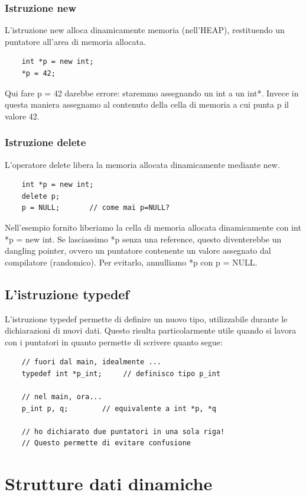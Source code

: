 \documentclass[12pt]{article}
\begin{document}
\subsubsection{Istruzione new}
\label{sssec:new_operator}
L'istruzione new alloca dinamicamente memoria (nell'HEAP), restituendo un puntatore all'area di memoria allocata.
\begin{lstlisting}
    int *p = new int;
    *p = 42;
\end{lstlisting}
Qui fare p = 42 darebbe errore: staremmo assegnando un int a un int*. Invece in questa maniera assegnamo al contenuto della cella di memoria a cui punta p il valore 42. 

\subsubsection{Istruzione delete}
\label{sssec:delete_operator}
L'operatore delete libera la memoria allocata dinamicamente mediante new.
\begin{lstlisting}
    int *p = new int;
    delete p;
    p = NULL;       // come mai p=NULL?
\end{lstlisting}
Nell'esempio fornito liberiamo la cella di memoria allocata dinamicamente con int *p = new int. Se lasciassimo *p senza una reference, questo diventerebbe un dangling pointer, ovvero un puntatore contenente un valore assegnato dal compilatore (randomico). Per evitarlo, annulliamo *p con p = NULL. 

\subsection{L'istruzione typedef}
\label{ssec:typedef_instruction}
L'istruzione typedef permette di definire un nuovo tipo, utilizzabile durante le dichiarazioni di nuovi dati. Questo risulta particolarmente utile quando si lavora con i puntatori in quanto permette di scrivere quanto segue:
\begin{lstlisting}
    // fuori dal main, idealmente ...
    typedef int *p_int;     // definisco tipo p_int

    // nel main, ora...
    p_int p, q;        // equivalente a int *p, *q

    // ho dichiarato due puntatori in una sola riga!
    // Questo permette di evitare confusione
\end{lstlisting}

\section{Strutture dati dinamiche}
\label{sec:strutture_dati_dinamiche}
\end{document}
